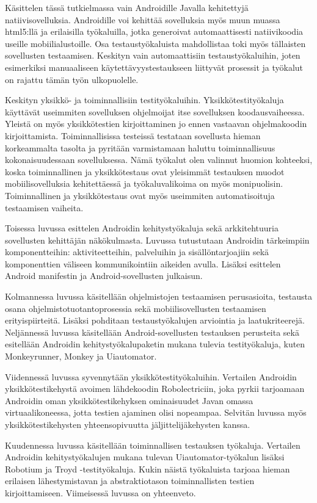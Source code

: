 Käsittelen tässä tutkielmassa vain Androidille Javalla kehitettyjä natiivisovelluksia. Androidille voi kehittää sovelluksia myös muun muassa html5:llä ja erilaisilla työkaluilla, jotka generoivat automaattisesti natiivikoodia useille mobiilialustoille. Osa testaustyökaluista mahdollistaa toki myös tällaisten sovellusten testaamisen. Keskityn vain automaattisiin testaustyökaluihin, joten esimerkiksi manuaaliseen käytettävyystestaukseen liittyvät prosessit ja työkalut on rajattu tämän työn ulkopuolelle.

Keskityn yksikkö- ja toiminnallisiin testityökaluihin. Yksikkötestityökaluja käyttävät useimmiten sovelluksen ohjelmoijat itse sovelluksen koodausvaiheessa. Yleistä on myös yksikkötestien kirjoittaminen jo ennen vastaavan ohjelmakoodin kirjoittamista. Toiminnallisissa testeissä testataan sovellusta hieman korkeammalta tasolta ja pyritään varmistamaan haluttu toiminnallisuus kokonaisuudessaan sovelluksessa. Nämä työkalut olen valinnut huomion kohteeksi, koska toiminnallinen ja yksikkötestaus ovat yleisimmät testauksen muodot mobiilisovelluksia kehitettäessä ja työkaluvalikoima on myös monipuolisin. Toiminnallinen ja yksikkötestaus ovat myös useimmiten automatisoituja testaamisen vaiheita.

Toisessa luvussa esittelen Androidin kehitystyökaluja sekä arkkitehtuuria sovellusten kehittäjän näkökulmasta. Luvussa tutustutaan Androidin tärkeimpiin komponentteihin: aktiviteetteihin, palveluihin ja sisällöntarjoajiin sekä komponenttien väliseen kommunikointiin aikeiden avulla. Lisäksi esittelen Android manifestin ja Android-sovellusten julkaisun.

Kolmannessa luvussa käsitellään ohjelmistojen testaamisen perusasioita, testausta osana ohjelmistotuotantoprosessia sekä mobiilisovellusten testaamisen erityispiirteitä. Lisäksi pohditaan testaustyökalujen arviointia ja laatukriteerejä. Neljännessä luvussa käsitellään Android-sovellusten testauksen perusteita sekä esitellään Androidin kehitystyökalupaketin mukana tulevia testityökaluja, kuten Monkeyrunner, Monkey ja Uiautomator.

Viidennessä luvussa syvennytään yksikkötestityökaluihin. Vertailen Androidin yksikkötestikehystä avoimen lähdekoodin Robolectriciin, joka pyrkii tarjoamaan Androidin oman yksikkötestikehyksen ominaisuudet Javan omassa virtuaalikoneessa, jotta testien ajaminen olisi nopeampaa. Selvitän luvussa myös yksikkötestikehysten yhteensopivuutta jäljittelijäkehysten kanssa.

Kuudennessa luvussa käsitellään toiminnallisen testauksen työkaluja. Vertailen Androidin kehitystyökalujen mukana tulevan Uiautomator-työkalun lisäksi Robotium ja Troyd -testityökaluja. Kukin näistä työkaluista tarjoaa hieman erilaisen lähestymistavan ja abstraktiotason toiminnallisten testien kirjoittamiseen. Viimeisessä luvussa on yhteenveto.